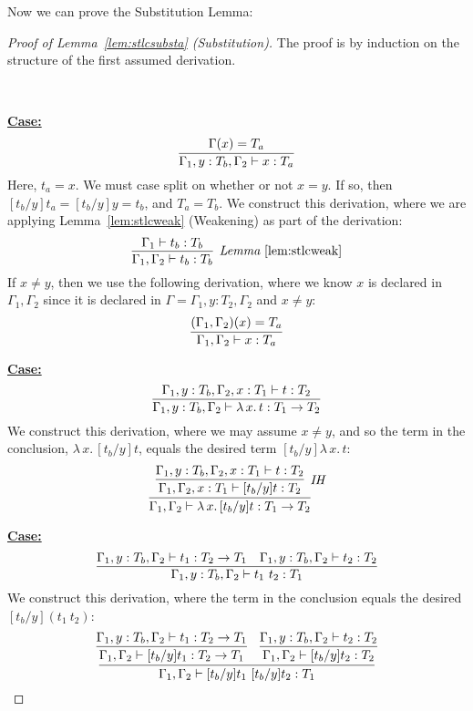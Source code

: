 \documentclass{article}
\begin{document}
\noindent Now we can prove the Substitution Lemma:

\begin{proof}[Proof of Lemma~\ref{lem:stlcsubsta} (Substitution)]
The proof is by induction on the structure of the first assumed derivation.

\ 

\noindent \underline{\textbf{Case:}}
\[
\infer{\Gamma_1,y:T_b,\Gamma_2\vdash x : T_a}{\Gamma(x) = T_a} 
\]
\noindent Here, $t_a = x$.  We must case split on whether or not $x =
y$.  If so, then $[t_b/y]t_a = [t_b/y]y = t_b$, and $T_a = T_b$.  We
construct this derivation, where we are applying
Lemma~\ref{lem:stlcweak} (Weakening) as part of the derivation:
\[
\infer[\textit{Lemma}~\ref{lem:stlcweak}]{\Gamma_1,\Gamma_2\vdash t_b:T_b}{\Gamma_1\vdash t_b:T_b}
\]
\noindent If $x\neq y$, then we use the following derivation, where we know $x$ is declared
in $\Gamma_1,\Gamma_2$ since it is declared in $\Gamma = \Gamma_1,y:T_2,\Gamma_2$ and
$x\neq y$:
\[
\infer{\Gamma_1,\Gamma_2\vdash x : T_a}{(\Gamma_1,\Gamma_2)(x) = T_a} 
\]

\noindent \underline{\textbf{Case:}}
\[
\infer{\Gamma_1,y:T_b,\Gamma_2\vdash \lambda\,x.\,t : T_1\to T_2}{\Gamma_1,y:T_b,\Gamma_2,x:T_1\vdash t:T_2}
\]
\noindent We construct this derivation, where we may assume $x\neq y$, and so the term in
the conclusion, $\lambda\,x.\,[t_b/y]t$, equals the desired term $[t_b/y]\lambda\,x.\,t$:
\[
\infer{\Gamma_1,\Gamma_2\vdash \lambda\,x.\,[t_b/y]t : T_1\to T_2}
      {\infer[\textit{IH}]{\Gamma_1,\Gamma_2,x:T_1\vdash [t_b/y]t:T_2}{\Gamma_1,y:T_b,\Gamma_2,x:T_1\vdash t:T_2}}
\]

\noindent\underline{\textbf{Case:}}
\[
\infer{\Gamma_1,y:T_b,\Gamma_2\vdash t_1\ t_2 : T_1}
      {\Gamma_1,y:T_b,\Gamma_2\vdash t_1 : T_2 \to T_1 &
       \Gamma_1,y:T_b,\Gamma_2\vdash t_2 : T_2}
\]
\noindent We construct this derivation, where the term in the conclusion equals
the desired $[t_b/y](t_1\ t_2)$:
\[
\infer{\Gamma_1,\Gamma_2\vdash [t_b/y]t_1\ [t_b/y]t_2 : T_1}
      {\infer{\Gamma_1,\Gamma_2\vdash [t_b/y]t_1 : T_2 \to T_1}{\Gamma_1,y:T_b,\Gamma_2\vdash t_1 : T_2 \to T_1} &
       \infer{\Gamma_1,\Gamma_2\vdash [t_b/y]t_2 : T_2}{\Gamma_1,y:T_b,\Gamma_2\vdash t_2 : T_2}}
\]

\end{proof}
\end{document}
